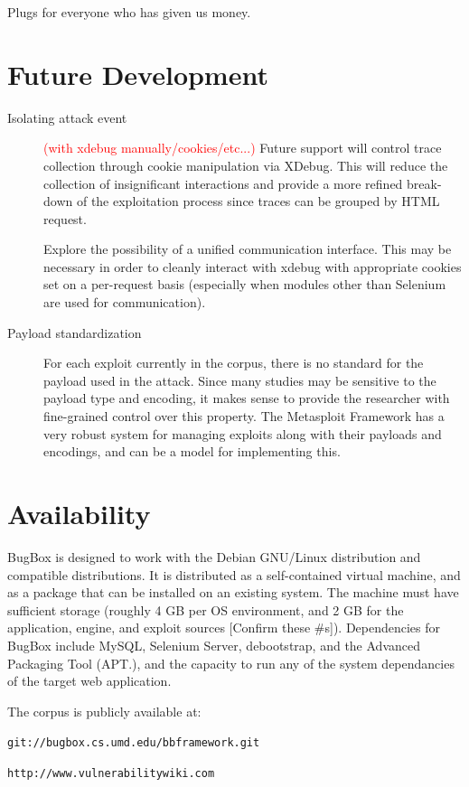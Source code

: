 \documentclass[letterpaper,twocolumn,10pt]{article}
\begin{document}
Plugs for everyone who has given us money.

\section{Future Development}
 \begin{description}
   \item[Isolating attack event]
     \textcolor{red}{(with xdebug manually/cookies/etc...)}   
  Future support will control trace collection through cookie manipulation via XDebug. This will reduce the collection of insignificant interactions and provide a more refined break-down of the exploitation process since traces can be grouped by HTML request.  \par
   Explore the possibility of a unified communication interface. This may be necessary in order to cleanly interact with xdebug with appropriate cookies set on a per-request basis (especially when modules other than Selenium are used for communication).
   \item[Payload standardization]
For each exploit currently in the corpus, there is no standard for the payload used in the attack. Since many studies may be sensitive to the payload type and encoding, it makes sense to provide the researcher with fine-grained control over this property. The Metasploit Framework has a very robust system for managing exploits along with their payloads and encodings, and can be a model for implementing this.
 \end{description}


\section{Availability}

BugBox is designed to work with the Debian GNU/Linux distribution and compatible distributions.  It is distributed as a self-contained virtual machine, and as a package that can be installed on an existing system. The machine must have sufficient storage (roughly 4 GB per OS environment, and 2 GB for the application, engine, and exploit sources [Confirm these \#s]).  Dependencies for BugBox include MySQL,  Selenium Server, debootstrap, and the Advanced Packaging Tool (APT.), and the capacity to run any of the system dependancies of the target web application.

The corpus is publicly available at:

\begin{center}
{\tt git://bugbox.cs.umd.edu/bbframework.git}
\end{center}

\begin{center}
{\tt http://www.vulnerabilitywiki.com}
\end{center}

{\footnotesize 
}
\end{document}

